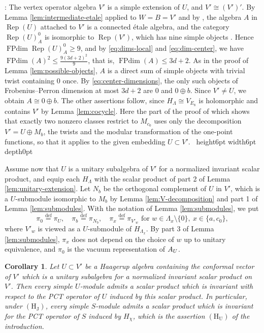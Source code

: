 \documentclass[leqno]{article}
\let\cal\relax
\newcommand{\cal}{\mathcal}
\renewcommand{\leq}{\ensuremath{\leqslant}}
\renewcommand{\geq}{\ensuremath{\geqslant}}
\newcommand{\qed}{\hfill \vrule height6pt  width6pt depth0pt}
\newcommand{\ov}{\overset}
\DeclareMathOperator{\Rep}{Rep} %
\newtheorem{cor}[thm]{Corollary}
\newenvironment{proof}[1][]{\noindent {\it Proof #1} : }{\hbox{~}\qed
\smallskip
}
\numberwithin{equation}{section}
\begin{document}
\begin{proof}
The vertex operator algebra $V'$ is a simple extension of $U$, and $V' \cong (V')'$. By Lemma \ref{lem:intermediate-etale} applied to $W = B = V'$ and by \cite[Theorem 3.4 p.~16]{HKL15}, the algebra $A$ in $\Rep(U)$ attached to $V'$ is a connected \'etale algebra, and the category $\Rep(U)^0_A$ is isomorphic to $\Rep(V')$, which has nine simple objects \cite{Don93}. Hence $\operatorname{FPdim} \Rep(U)^0_A \geq 9$, and by \eqref{eq:dims-local} and \eqref{eq:dim-center}, we have $\operatorname{FPdim}(A)^2 \leq \frac{9(3d+2)^2}{9}$, that is, $\operatorname{FPdim}(A) \leq 3d+2$. As in the proof of Lemma \ref{lem:possible-objects}, $A$ is a direct sum of simple objects with trivial twist containing $0$ once. By \eqref{eq:center-dimensions}, the only such objects of Frobenius--Perron dimension at most $3d+2$ are $0$ and $0 \oplus b$. Since $V' \neq U$, we obtain $A \cong 0 \oplus b$. The other assertions follow, since $H_\Lambda \cong V_{E_8}$ is holomorphic and contains $V'$ by Lemma \ref{lem:cocycle}. Here the part of the proof of \cite[Lemma 4.3]{Arh26} which shows that exactly two nonzero classes restrict to $M_{c_0}$ uses only the decomposition $V' = U \oplus M_b$, the twists and the modular transformation of the one-point functions, so that it applies to the given embedding $U \subset V'$.
\end{proof}

Assume now that $U$ is a unitary subalgebra of $V'$ for a normalized invariant scalar product, and equip each $H_\Lambda$ with the scalar product of part 2 of Lemma \ref{lem:unitary-extension}. Let $N_b$ be the orthogonal complement of $U$ in $V'$, which is a $U$-submodule isomorphic to $M_b$ by Lemma \ref{lem:V-decomposition} and part 1 of Lemma \ref{lem:submodules}. With the notation of Lemma \ref{lem:submodules}, we put
\[
\pi_0 \ov{\mathrm{def}}{=} \pi_U,\quad \pi_b \ov{\mathrm{def}}{=} \pi_{N_b},\quad \pi_x \ov{\mathrm{def}}{=} \pi_{V'_w} \text{ for } w \in \Lambda_x \setminus \{0\},\ x \in \{a,c_0\},
\]
where $V'_w$ is viewed as a $U$-submodule of $H_{\Lambda_x}$. By part 3 of Lemma \ref{lem:submodules}, $\pi_x$ does not depend on the choice of $w$ up to unitary equivalence, and $\pi_0$ is the vacuum representation of $\cal A_U$.

\begin{cor}
\label{cor:modules-unitary}
Let $U \subset V'$ be a Haagerup algebra containing the conformal vector of $V'$ which is a unitary subalgebra for a normalized invariant scalar product on $V'$. Then every simple $U$-module admits a scalar product which is invariant with respect to the PCT operator of $U$ induced by this scalar product. In particular, under $\mathrm{(H_J)}$, every simple $S$-module admits a scalar product which is invariant for the PCT operator of $S$ induced by $H_\chi$, which is the assertion $\mathrm{(H_U)}$ of the introduction.
\end{cor}
\end{document}
